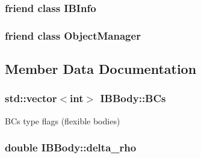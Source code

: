 \subsubsection[{\texorpdfstring{I\+B\+Info}{IBInfo}}]{\setlength{\rightskip}{0pt plus 5cm}friend class {\bf I\+B\+Info}\hspace{0.3cm}{\ttfamily [friend]}}\hypertarget{class_i_b_body_a54980b051e93ff6b0f02df2ff7fee3a8}{}\label{class_i_b_body_a54980b051e93ff6b0f02df2ff7fee3a8}
\subsubsection[{\texorpdfstring{Object\+Manager}{ObjectManager}}]{\setlength{\rightskip}{0pt plus 5cm}friend class {\bf Object\+Manager}\hspace{0.3cm}{\ttfamily [friend]}}\hypertarget{class_i_b_body_a8b86bdcdb7c54a536293d8632363e114}{}\label{class_i_b_body_a8b86bdcdb7c54a536293d8632363e114}


\subsection{Member Data Documentation}
\subsubsection[{\texorpdfstring{B\+Cs}{BCs}}]{\setlength{\rightskip}{0pt plus 5cm}std\+::vector$<$int$>$ I\+B\+Body\+::\+B\+Cs\hspace{0.3cm}{\ttfamily [protected]}}\hypertarget{class_i_b_body_ad9fa313d9cb2c2c463740eed5a1faf16}{}\label{class_i_b_body_ad9fa313d9cb2c2c463740eed5a1faf16}


B\+Cs type flags (flexible bodies) 

\subsubsection[{\texorpdfstring{delta\+\_\+rho}{delta_rho}}]{\setlength{\rightskip}{0pt plus 5cm}double I\+B\+Body\+::delta\+\_\+rho\hspace{0.3cm}{\ttfamily [protected]}}\hypertarget{class_i_b_body_a18cd092961f02ecde55363a4d342d098}{}\label{class_i_b_body_a18cd092961f02ecde55363a4d342d098}


